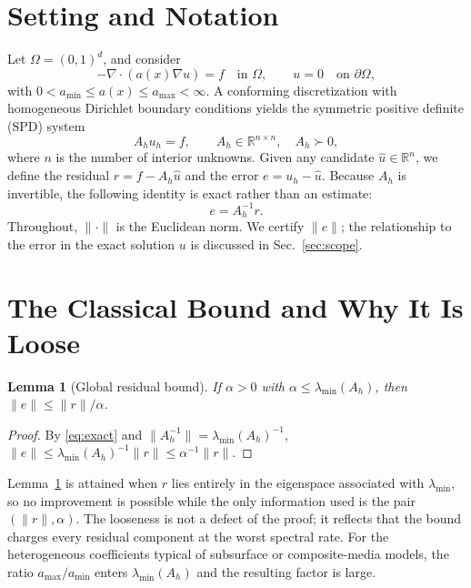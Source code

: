 \documentclass[journal]{IEEEtran}
\theoremstyle{plain}
\newtheorem{lemma}{Lemma}
\theoremstyle{definition}
\begin{document}
\section{Setting and Notation}
Let $\Omega=(0,1)^d$, and consider
\begin{equation}
-\nabla\cdot(a(x)\nabla u)=f \quad\text{in }\Omega,\qquad u=0 \quad\text{on }\partial\Omega,
\label{eq:pde}
\end{equation}
with $0<a_{\min}\le a(x)\le a_{\max}<\infty$. A conforming discretization with homogeneous
Dirichlet boundary conditions yields the symmetric positive definite (SPD) system
\begin{equation}
A_h u_h=f,\qquad A_h\in\mathbb{R}^{n\times n},\quad A_h\succ0,
\label{eq:sys}
\end{equation}
where $n$ is the number of interior unknowns. Given any candidate $\hat u\in\mathbb{R}^n$,
we define the residual $r=f-A_h\hat u$ and the error $e=u_h-\hat u$. Because $A_h$ is
invertible, the following identity is exact rather than an estimate:
\begin{equation}
e=A_h^{-1}r .
\label{eq:exact}
\end{equation}
Throughout, $\|\cdot\|$ is the Euclidean norm. We certify $\|e\|$; the relationship to
the error in the exact solution $u$ is discussed in Sec.~\ref{sec:scope}.

\section{The Classical Bound and Why It Is Loose}
\begin{lemma}[Global residual bound]\label{lem:global}
If $\alpha>0$ with $\alpha\le\lambda_{\min}(A_h)$, then $\|e\|\le\|r\|/\alpha$.
\end{lemma}
\begin{proof}
By \eqref{eq:exact} and $\|A_h^{-1}\|=\lambda_{\min}(A_h)^{-1}$,
$\|e\|\le\lambda_{\min}(A_h)^{-1}\|r\|\le\alpha^{-1}\|r\|$.
\end{proof}

Lemma~\ref{lem:global} is attained when $r$ lies entirely in the eigenspace associated
with $\lambda_{\min}$, so no improvement is possible while the only information used is
the pair $(\|r\|,\alpha)$. The looseness is not a defect of the proof; it reflects that
the bound charges every residual component at the worst spectral rate. For the
heterogeneous coefficients typical of subsurface or composite-media models, the ratio
$a_{\max}/a_{\min}$ enters $\lambda_{\min}(A_h)$ and the resulting factor is large.
\end{document}

